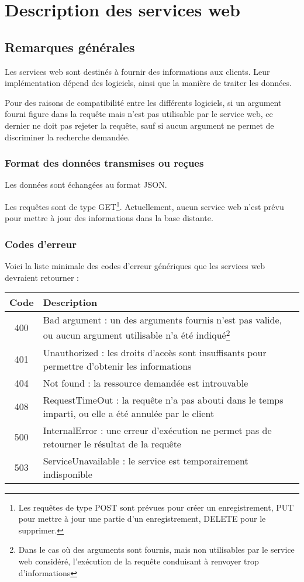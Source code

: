 \chapter{Description des services web}

\section{Remarques générales}

Les services web sont destinés à fournir des informations aux clients. Leur implémentation dépend des logiciels, ainsi que la manière de traiter les données.

Pour des raisons de compatibilité entre les différents logiciels, si un argument fourni figure dans la requête mais n'est pas utilisable par le service web, ce dernier ne doit pas rejeter la requête, sauf si aucun argument ne permet de discriminer la recherche demandée.

\subsection{Format des données transmises ou reçues}
Les données sont échangées au format JSON.

Les requêtes sont de type GET\footnote{Les requêtes de type POST sont prévues pour créer un enregistrement, PUT pour mettre à jour une partie d'un enregistrement, DELETE pour le supprimer.}. 
Actuellement, aucun service web n'est prévu pour mettre à jour des informations dans la base distante.

\subsection{Codes d'erreur}

Voici la liste minimale des codes d'erreur génériques que les services web devraient retourner :
\begin{longtable}{|c|>{\raggedright\arraybackslash}p{10cm}|}
\hline 
Code &  Description \\ 
\hline \endhead
400 & Bad argument : un des arguments fournis n'est pas valide, ou aucun argument utilisable n'a été indiqué\footnote{Dans le cas où des arguments sont fournis, mais non utilisables par le service web considéré, l'exécution de la requête conduisant à renvoyer trop d'informations} \\
\hline
401 & Unauthorized : les droits d'accès sont insuffisants pour permettre d'obtenir les informations \\
\hline
404 & Not found : la ressource demandée est introuvable\\
\hline
408 & RequestTimeOut : la requête n'a pas abouti dans le temps imparti, ou elle a été annulée par le client\\
\hline
500 & InternalError : une erreur d'exécution ne permet pas de retourner le résultat de la requête\\
\hline
503 & ServiceUnavailable : le service est temporairement indisponible\\
\hline
\end{longtable} 

